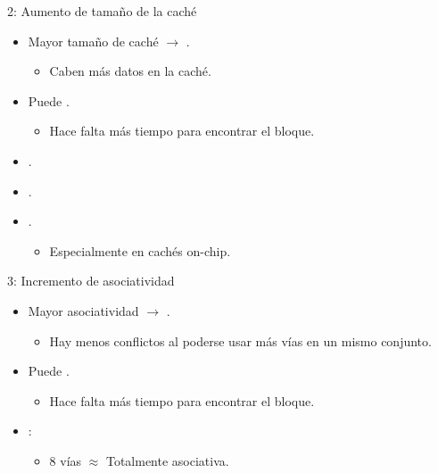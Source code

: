 \begin{frame}[t]{2: Aumento de tamaño de la caché}
\begin{itemize}
  \item Mayor tamaño de caché $\rightarrow$ .
    \begin{itemize}
      \item Caben más datos en la caché.
    \end{itemize}

  \item Puede .
    \begin{itemize}
      \item Hace falta más tiempo para encontrar el bloque.
    \end{itemize}

  \item {}.

  \item {}.

  \item {}.
    \begin{itemize}
      \item Especialmente en cachés on-chip.
    \end{itemize}
\end{itemize}
\end{frame}

\begin{frame}[t]{3: Incremento de asociatividad}
\begin{itemize}
  \item Mayor asociatividad $\rightarrow$ .
    \begin{itemize}
      \item Hay menos conflictos al poderse usar más vías en un mismo conjunto.
    \end{itemize}

  \item Puede .
    \begin{itemize}
      \item Hace falta más tiempo para encontrar el bloque.
    \end{itemize}

  \item {}:
    \begin{itemize}
      \item 8 vías $\approx$ Totalmente asociativa.
    \end{itemize}
\end{itemize}
\end{frame}

